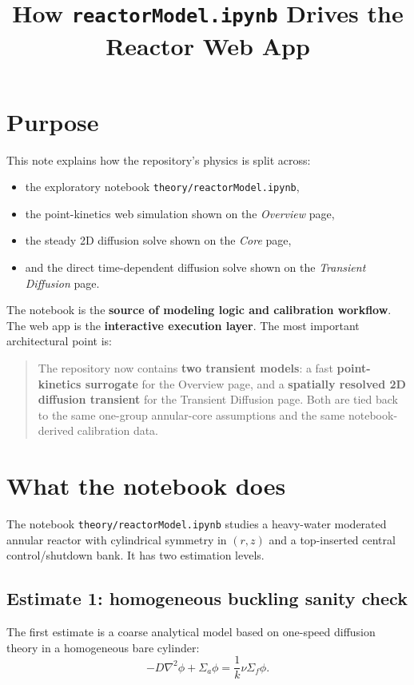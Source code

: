 \documentclass[11pt]{article}
\title{How \texttt{reactorModel.ipynb} Drives the Reactor Web App}
\author{}
\date{}
\begin{document}
\maketitle

\section{Purpose}

This note explains how the repository's physics is split across:
\begin{itemize}
  \item the exploratory notebook \texttt{theory/reactorModel.ipynb},
  \item the point-kinetics web simulation shown on the \emph{Overview} page,
  \item the steady 2D diffusion solve shown on the \emph{Core} page,
  \item and the direct time-dependent diffusion solve shown on the
  \emph{Transient Diffusion} page.
\end{itemize}

The notebook is the \textbf{source of modeling logic and calibration workflow}.
The web app is the \textbf{interactive execution layer}.  The most important
architectural point is:

\begin{quote}
The repository now contains \textbf{two transient models}: a fast
\textbf{point-kinetics surrogate} for the Overview page, and a
\textbf{spatially resolved 2D diffusion transient} for the Transient Diffusion
page.  Both are tied back to the same one-group annular-core assumptions and
the same notebook-derived calibration data.
\end{quote}

\section{What the notebook does}

The notebook \texttt{theory/reactorModel.ipynb} studies a heavy-water moderated
annular reactor with cylindrical symmetry in $(r,z)$ and a top-inserted central
control/shutdown bank.  It has two estimation levels.

\subsection{Estimate 1: homogeneous buckling sanity check}

The first estimate is a coarse analytical model based on one-speed diffusion
theory in a homogeneous bare cylinder:
\[
-D\nabla^2 \phi + \Sigma_a \phi = \frac{1}{k}\nu\Sigma_f \phi.
\]
\end{document}

